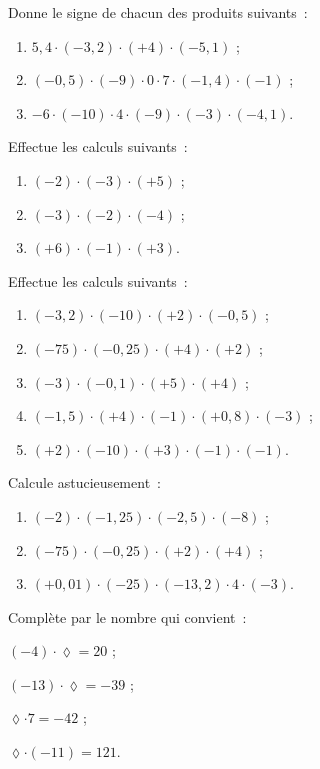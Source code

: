 \begin{exercice}
Donne le signe de chacun des produits suivants :
\begin{enumerate}
 \item $5,4 \cdot (-3,2) \cdot (+4) \cdot (-5,1)$ ;
 \item $(-0,5) \cdot (-9) \cdot 0 \cdot 7 \cdot (-1,4) \cdot (-1)$ ;
 \item $-6 \cdot (-10) \cdot 4 \cdot (-9) \cdot (-3) \cdot (-4,1)$.
 \end{enumerate}
\end{exercice}


\begin{exercice}
Effectue les calculs suivants :
\begin{enumerate}
 \item $(-2) \cdot (-3) \cdot (+5)$ ;
 \item $(-3) \cdot (-2) \cdot (-4)$ ;
 \item $(+6) \cdot (-1) \cdot (+3)$.
 \end{enumerate}
\end{exercice}


\begin{exercice}
Effectue les calculs suivants :
\begin{enumerate}
 \item $(-3,2) \cdot (-10) \cdot (+2) \cdot (-0,5)$ ;
 \item $(-75) \cdot (-0,25) \cdot (+4) \cdot (+2)$ ;
 \item $(-3) \cdot (-0,1) \cdot (+5) \cdot (+4)$ ;
 \item $(-1,5) \cdot (+4) \cdot (-1) \cdot (+0,8) \cdot (-3)$ ;
 \item $(+2) \cdot (-10) \cdot (+3) \cdot (-1) \cdot (-1)$.
 \end{enumerate}
\end{exercice}


\begin{exercice}
Calcule astucieusement :
\begin{enumerate}
 \item $(-2) \cdot (-1,25) \cdot (-2,5) \cdot (-8)$ ;
 \item $(-75) \cdot (-0,25) \cdot (+2) \cdot (+4)$ ;
 \item $(+0,01) \cdot (-25) \cdot (-13,2) \cdot 4 \cdot (-3)$.
 \end{enumerate}
\end{exercice}


\begin{exercice}
Complète par le nombre qui convient :
\begin{colenumerate}{2}
 \item $(-4) \cdot \lozenge = 20$ ;
 \item $(-13) \cdot \lozenge = -39$ ;  
 \item $\lozenge \cdot 7 = -42$ ;
 \item $\lozenge \cdot (-11) = 121$.
 \end{colenumerate}
\end{exercice}


